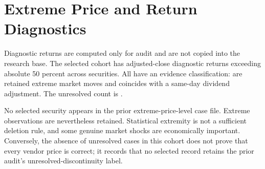 \section{Extreme Price and Return Diagnostics}

Diagnostic returns are computed only for audit and are not copied into the
research base. The selected cohort has \ExtremeReturns{} adjusted-close
diagnostic returns exceeding absolute 50 percent across
\ExtremeReturnSecurities{} securities. All have an evidence classification:
\RetainedExtremeMarketMoves{} are retained extreme market moves and
\SameDayDividendAdjustmentCases{} coincides with a same-day dividend adjustment.
The unresolved count is \UnresolvedExtremeCases{}.

No selected security appears in the prior extreme-price-level case file.
Extreme observations are nevertheless retained. Statistical extremity is not a
sufficient deletion rule, and some genuine market shocks are economically
important. Conversely, the absence of unresolved cases in this cohort does not
prove that every vendor price is correct; it records that no selected record
retains the prior audit's unresolved-discontinuity label.

\begin{table}[tbp]
\centering
\caption{Extreme diagnostic-return classifications after filtering}
\label{tab:extreme-classes}
\end{table}

